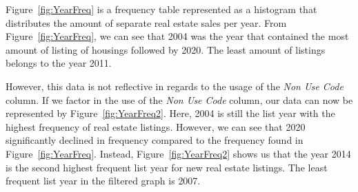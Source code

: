 \documentclass[12pt]{article}
\begin{document}
Figure~\ref{fig:YearFreq} is a frequency table represented as a histogram that distributes the amount of separate real estate sales per year. From Figure~\ref{fig:YearFreq}, we can see that 2004 was the year that contained the most amount of listing of housings followed by 2020. The least amount of listings belongs to the year 2011. 

However, this data is not reflective in regards to the usage of the \textit{Non Use Code} column. If we factor in the use of the \textit{Non Use Code} column, our data can now be represented by Figure~\ref{fig:YearFreq2}. Here, 2004 is still the list year with the highest frequency of real estate listings. However, we can see that 2020 significantly declined in frequency compared to the frequency found in Figure~\ref{fig:YearFreq}. Instead, Figure~\ref{fig:YearFreq2} shows us that the year 2014 is the second highest frequent list year for new real estate listings. The least frequent list year in the filtered graph is 2007. 
\end{document}
